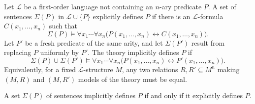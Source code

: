 
\begin{definition}
Let $\mathcal L$ be a first-order language not containing an $n$-ary predicate
$P$. A set of sentences $\Sigma(P)$ in $\mathcal L\cup\{P\}$ explicitly
defines $P$ if there is an $\mathcal L$-formula $C(x_1,\ldots,x_n)$ such that
\[
 \Sigma(P)\models\forall x_1\cdots\forall x_n
       \bigl(P(x_1,\ldots,x_n)\leftrightarrow C(x_1,\ldots,x_n)\bigr).
\]
Let $P'$ be a fresh predicate of the same arity, and let $\Sigma(P')$ result
from replacing $P$ uniformly by $P'$. The theory implicitly defines $P$ if
\[
 \Sigma(P)\cup\Sigma(P')\models\forall x_1\cdots\forall x_n
       \bigl(P(x_1,\ldots,x_n)\leftrightarrow P'(x_1,\ldots,x_n)\bigr).
\]
Equivalently, for a fixed $\mathcal L$-structure $M$, any two relations
$R,R'\subseteq M^n$ making $(M,R)$ and $(M,R')$ models of the theory must be equal.
\end{definition}
\begin{theorem}
A set $\Sigma(P)$ of sentences implicitly defines $P$ if and only if it
explicitly defines $P$.
\end{theorem}
